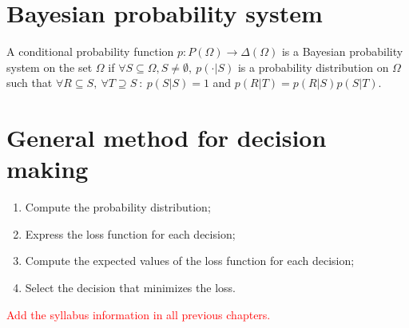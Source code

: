 \documentclass[12pt, openany]{report}
\theoremstyle{definition}
\begin{document}
\section{Bayesian probability system}
A conditional probability function $p:P(\Omega)\to \Delta(\Omega)$ is a Bayesian probability system on the set $\Omega$ if $\forall S\subseteq \Omega, S\neq \emptyset,\ p(\cdot|S)$ is a probability distribution on $\Omega$ such that $\forall R\subseteq S, \ \forall T\supseteq S \ : \ p(S|S)=1$ and $p(R|T)=p(R|S)p(S|T)$.
\section{General method for decision making}
\begin{enumerate}
	\item Compute the probability distribution;
	\item Express the loss function for each decision;
	\item Compute the expected values of the loss function for each decision;
	\item Select the decision that minimizes the loss.
\end{enumerate}
\textcolor{red}{Add the syllabus information in all previous chapters.}
\end{document}
